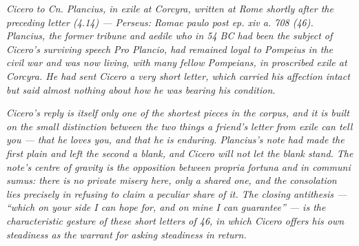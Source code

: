 
\textit{Cicero to Cn. Plancius, in exile at Corcyra, written at
Rome shortly after the preceding letter (4.14) --- Perseus:
\textit{Romae paulo post ep. xiv a. 708 (46)}. Plancius, the
former tribune and aedile who in 54 BC had been the subject of
Cicero's surviving speech \textit{Pro Plancio}, had remained
loyal to Pompeius in the civil war and was now living, with
many fellow Pompeians, in proscribed exile at Corcyra. He had
sent Cicero a very short letter, which carried his affection
intact but said almost nothing about how he was bearing his
condition.}

\textit{Cicero's reply is itself only one of the shortest pieces
in the corpus, and it is built on the small distinction between
the two things a friend's letter from exile can tell you ---
that he loves you, and that he is enduring. Plancius's note had
made the first plain and left the second a blank, and Cicero
will not let the blank stand. The note's centre of gravity is
the opposition between \textit{propria fortuna} and \textit{in
communi sumus}: there is no private misery here, only a shared
one, and the consolation lies precisely in refusing to claim a
peculiar share of it. The closing antithesis --- ``which on your
side I can hope for, and on mine I can guarantee'' --- is the
characteristic gesture of these short letters of 46, in which
Cicero offers his own steadiness as the warrant for asking
steadiness in return.}
